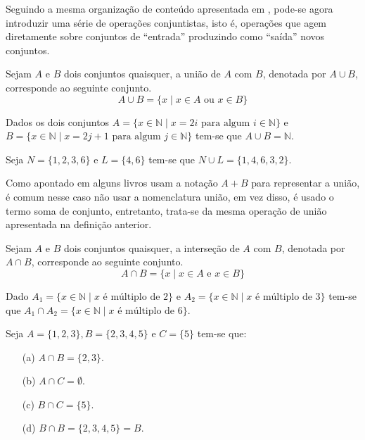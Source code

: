 Seguindo a mesma organização de conteúdo apresentada em \cite{lipschutz2013-MD}, pode-se agora introduzir uma série de operações conjuntistas, isto é, operações que agem diretamente sobre conjuntos de ``entrada'' produzindo como ``saída'' novos conjuntos.

\begin{definition}\label{def:UniaoConjuntos}
	Sejam $A$ e $B$ dois conjuntos quaisquer, a união de $A$ com $B$, denotada por $A \cup B$, corresponde ao seguinte conjunto.
	$$A \cup B = \{x \mid x \in A \mbox{ ou } x \in B\}$$
\end{definition}

\begin{exem}\label{exe:UniaoDeConjuntos1}
	Dados os dois conjuntos $A = \{x \in \mathbb{N} \mid x = 2i \mbox{ para algum } i \in \mathbb{N}\}$ e $B = \{x \in \mathbb{N} \mid x = 2j + 1 \mbox{ para algum } j \in \mathbb{N}\}$ tem-se que $A \cup B = \mathbb{N}$.
\end{exem}

\begin{exem}\label{exe:UniaoDeConjuntos2}
	Seja $N = \{1, 2, 3, 6\}$ e $L = \{4, 6\}$ tem-se que $N \cup L = \{1, 4, 6, 3, 2\}$.
\end{exem}

Como apontado em \cite{lipschutz1978-TC} alguns livros usam a notação $A + B$ para representar a união, é comum nesse caso não usar a nomenclatura união, em vez disso, é usado o termo soma de conjunto, entretanto, trata-se da mesma operação de união apresentada na definição anterior.

\begin{definition}\label{def:IntersecaoConjuntos}
	Sejam $A$ e $B$ dois conjuntos quaisquer, a interseção de $A$ com $B$, denotada por $A \cap B$, corresponde ao seguinte conjunto.
	$$A \cap B = \{x \mid x \in A \mbox{ e } x \in B\}$$
\end{definition}

\begin{exem}\label{exe:IntersecaoDeConuuntos1}
	Dado $A_1 = \{x \in \mathbb{N} \mid x \mbox{ é múltiplo de } 2\}$ e $A_2 = \{x \in \mathbb{N} \mid x \mbox{ é múltiplo de } 3\}$ tem-se que $A_1 \cap A_2 = \{x \in \mathbb{N} \mid x \mbox{ é múltiplo de } 6\}$.
\end{exem}

\begin{exem}\label{exe:IntersecaoDeConuuntos2}
	Seja $A = \{1, 2, 3\}, B = \{2, 3, 4, 5\}$ e $C = \{5\}$ tem-se que:
	\begin{itemize}
		\item[(a)] $A \cap B = \{2, 3\}$.
		\item[(b)] $A \cap C = \emptyset$.
		\item[(c)] $B \cap C = \{5\}$.
		\item[(d)] $B \cap B = \{2, 3, 4, 5\} = B$.
	\end{itemize}
\end{exem}


